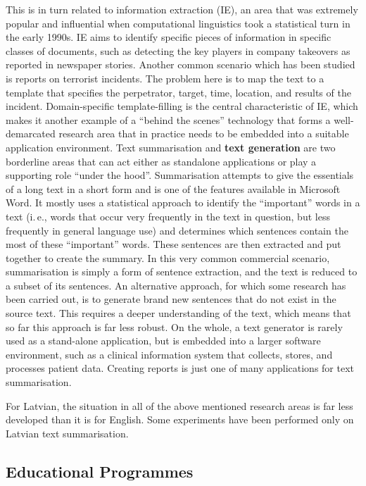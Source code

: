 \begin{multicols}{2}
This is in turn related to information extraction (IE), an area that was extremely popular and influential when computational linguistics took a statistical turn in the early 1990s.
IE aims to identify specific pieces of information in specific classes of documents, such as detecting the key players in company takeovers as reported in newspaper stories.
Another common scenario which has been studied is reports on terrorist incidents.
The problem here is to map the text to a template that specifies the perpetrator, target, time, location, and results of the incident.
Domain-specific template-filling is the central characteristic of IE, which makes it another example of a ``behind the scenes'' technology that forms a well-demarcated research area that in practice needs to be embedded into a suitable application environment. 
Text summarisation and \textbf{text generation} are two borderline areas that can act either as standalone applications or play a supporting role ``under the hood''.
Summarisation attempts to give the essentials of a long text in a short form and is one of the features available in Microsoft Word.
It mostly uses a statistical approach to identify the ``important'' words in a text (i.\,e., words that occur very frequently in the text in question, but less frequently in general language use) and determines which sentences contain the most of these ``important'' words.
These sentences are then extracted and put together to create the summary.
In this very common commercial scenario, summarisation is simply a form of sentence extraction, and the text is reduced to a subset of its sentences.
An alternative approach, for which some research has been carried out, is to generate brand new sentences that do not exist in the source text.
This requires a deeper understanding of the text, which means that so far this approach is far less robust.
On the whole, a text generator is rarely used as a stand-alone application, but is embedded into a larger software environment, such as a clinical information system that collects, stores, and processes patient data.
Creating reports is just one of many applications for text summarisation. 

For Latvian, the situation in all of the above mentioned research areas is far less developed than it is for English.
Some experiments have been performed only on Latvian text summarisation.

\subsection{Educational Programmes}


\end{multicols}
